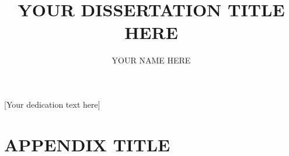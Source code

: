 \documentclass[12pt]{report}
\begin{document}
\author{YOUR NAME HERE}
\title{YOUR DISSERTATION TITLE HERE}

\titlepage

\copyrightpage

\newpage
\thispagestyle{empty}
\vspace*{1.0in}
\begin{center}
    [Your dedication text here]
\end{center}
\newpage

\begin{acknowledgements}
    
\end{acknowledgements}

\begin{abstract}
    
    \indent
\end{abstract}

\tableofcontents
\listoffigures
\listoftables
{}



\appendix
\chapter{APPENDIX TITLE}





\thebiography

\end{document}
